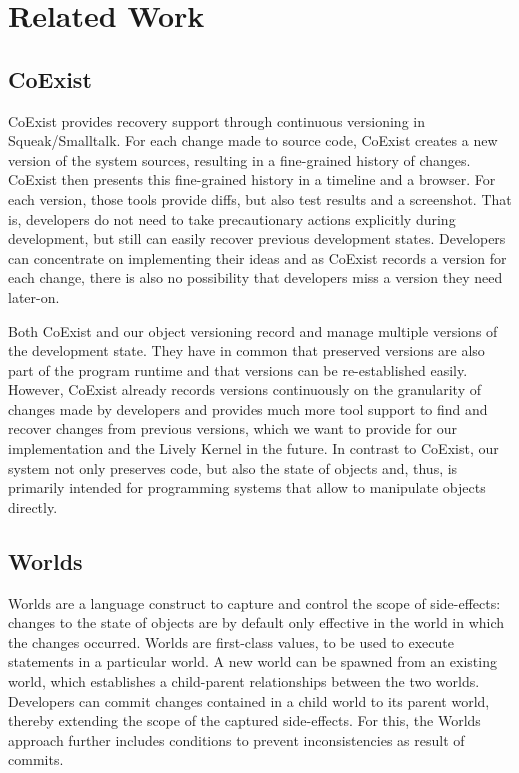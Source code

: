 \chapter{Related Work} \label{sec:RELATED_WORK}





\section{CoExist}

\cite{Steinert2012COE}
CoExist provides recovery support through continuous versioning in Squeak/Smalltalk.
For each change made to source code, CoExist creates a new version of the system sources, resulting in a fine-grained history of changes.
CoExist then presents this fine-grained history in a timeline and a browser.
For each version, those tools provide diffs, but also test results and a screenshot.
That is, developers do not need to take precautionary actions explicitly during development, but still can easily recover previous development states.
Developers can concentrate on implementing their ideas and as CoExist records a version for each change, there is also no possibility that developers miss a version they need later-on.

Both CoExist and our object versioning record and manage multiple versions of the development state.
They have in common that preserved versions are also part of the program runtime and that versions can be re-established easily.
However, CoExist already records versions continuously on the granularity of changes made by developers and provides much more tool support to find and recover changes from previous versions, which we want to provide for our implementation and the Lively Kernel in the future.
In contrast to CoExist, our system not only preserves code, but also the state of objects and, thus, is primarily intended for programming systems that allow to manipulate objects directly.



\section{Worlds}

Worlds are a language construct to capture and control the scope of side-effects: changes to the state of objects are by default only effective in the world in which the changes occurred.
Worlds are first-class values, to be used to execute statements in a particular world.
A new world can be spawned from an existing world, which establishes a child-parent relationships between the two worlds.
Developers can commit changes contained in a child world to its parent world, thereby extending the scope of the captured side-effects.
For this, the Worlds approach further includes conditions to prevent inconsistencies as result of commits.

